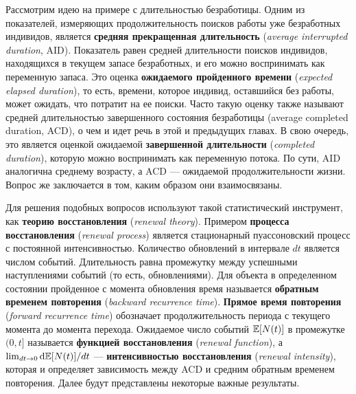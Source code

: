 Рассмотрим идею на примере с длительностью безработицы.
Одним из показателей, измеряющих продолжительность поисков работы уже безработных индивидов, является \textbf{средняя прекращенная длительность} (\textit{average interrupted duration}, AID). Показатель равен средней длительности поисков индивидов, находящихся в текущем запасе безработных, и его можно воспринимать как переменную запаса.
Это оценка \textbf{ожидаемого пройденного времени} (\textit{expected elapsed duration}), то есть, времени, которое индивид, оставшийся без работы, может ожидать, что потратит на ее поиски.
Часто такую оценку также называют средней длительностью завершенного состояния безработицы (average completed duration, ACD), о чем и идет речь в этой и предыдущих главах. В свою очередь, это является оценкой ожидаемой \textbf{завершенной длительности} (\textit{completed duration}), которую можно воспринимать как переменную потока.
По сути, AID аналогична среднему возрасту, а ACD --- ожидаемой продолжительности жизни. Вопрос же заключается в том, каким образом они взаимосвязаны.

Для решения подобных вопросов используют такой статистический инструмент, как \textbf{теорию восстановления} (\textit{renewal theory}).
Примером \textbf{процесса восстановления} (\textit{renewal process}) является стационарный пуассоновский процесс с постоянной интенсивностью. Количество обновлений в интервале $dt$ является числом событий. Длительность равна промежутку между успешными наступлениями событий (то есть, обновлениями). Для объекта в определенном состоянии пройденное с момента обновления время называется \textbf{обратным временем повторения} (\textit{backward recurrence time}). \textbf{Прямое время повторения} (\textit{forward recurrence time}) обозначает продолжительность периода с текущего момента до момента перехода. Ожидаемое число событий $\mathbb{E}[N(t)]$ в промежутке $(0, t]$ называется \textbf{функцией восстановления} (\textit{renewal function}), а $\lim_{dt\rightarrow0}\mathrm{d}\mathbb{E}[N(t)]/dt$ --- \textbf{интенсивностью восстановления} (\textit{renewal intensity}), которая и определяет зависимость между ACD и средним обратным временем повторения. Далее будут представлены некоторые важные результаты.

